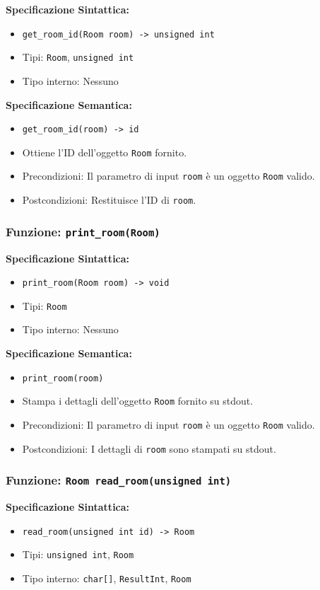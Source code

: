 \documentclass[11pt]{scrartcl} %
\begin{document}
\textbf{Specificazione Sintattica:}
\begin{itemize}
	\item \texttt{get\_room\_id(Room room) -> unsigned int}
	\item Tipi: \texttt{Room}, \texttt{unsigned int}
	\item Tipo interno: Nessuno
\end{itemize}

\textbf{Specificazione Semantica:}
\begin{itemize}
	\item \texttt{get\_room\_id(room) -> id}
	\item Ottiene l'ID dell'oggetto \texttt{Room} fornito.
	\item Precondizioni: Il parametro di input \texttt{room} è un oggetto \texttt{Room} valido.
	\item Postcondizioni: Restituisce l'ID di \texttt{room}.
\end{itemize}

\subsubsection{Funzione: \texttt{print\_room(Room)}}

\textbf{Specificazione Sintattica:}
\begin{itemize}
	\item \texttt{print\_room(Room room) -> void}
	\item Tipi: \texttt{Room}
	\item Tipo interno: Nessuno
\end{itemize}

\textbf{Specificazione Semantica:}
\begin{itemize}
	\item \texttt{print\_room(room)}
	\item Stampa i dettagli dell'oggetto \texttt{Room} fornito su stdout.
	\item Precondizioni: Il parametro di input \texttt{room} è un oggetto \texttt{Room} valido.
	\item Postcondizioni: I dettagli di \texttt{room} sono stampati su stdout.
\end{itemize}

\subsubsection{Funzione: \texttt{Room read\_room(unsigned int)}}

\textbf{Specificazione Sintattica:}
\begin{itemize}
	\item \texttt{read\_room(unsigned int id) -> Room}
	\item Tipi: \texttt{unsigned int}, \texttt{Room}
	\item Tipo interno: \texttt{char[]}, \texttt{ResultInt}, \texttt{Room}
\end{itemize}
\end{document}
